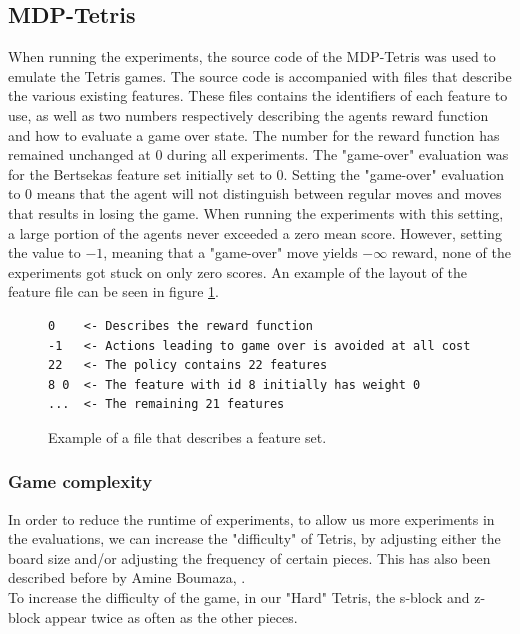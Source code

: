 \subsection{MDP-Tetris}

When running the experiments, the source code of the MDP-Tetris
\citep{mdptetris} was used to emulate the Tetris games.
The source code is accompanied with files that describe the
various existing features. These files contains the identifiers of 
each feature to use, as well as two numbers respectively describing 
the agents reward function and how to evaluate a game over state. 
The number for the reward function has remained unchanged at $0$ 
during all experiments. The "game-over" evaluation was for the
Bertsekas feature set initially set to $0$. Setting the 
"game-over" evaluation to $0$ means that the agent will not 
distinguish between regular moves and moves that results in losing
the game. When running the experiments with this setting, a large portion
of the agents never exceeded a zero mean score. However, setting the value
to $-1$, meaning that a "game-over" move yields $-\infty$ reward, 
none of the experiments got stuck on only zero scores. An example
of the layout of the feature file can be seen in figure \ref{fig:featfile}.
\begin{figure}[h!]
\centering
\begin{lstlisting}
0    <- Describes the reward function
-1   <- Actions leading to game over is avoided at all cost
22   <- The policy contains 22 features
8 0  <- The feature with id 8 initially has weight 0
...  <- The remaining 21 features
\end{lstlisting}
\caption{Example of a file that describes a feature set. \label{fig:featfile}}
\end{figure}

\subsubsection{Game complexity \label{HardTetris}}
In order to reduce the runtime of experiments, to allow us more experiments in the evaluations, we can increase the "difficulty" of Tetris, by adjusting either the board size and/or adjusting the frequency of certain pieces. This has also been described before by Amine Boumaza, \citep{boumaza2009}.\\
To increase the difficulty of the game,
in our "Hard" Tetris, the s-block and z-block appear twice as often 
as the other pieces.

